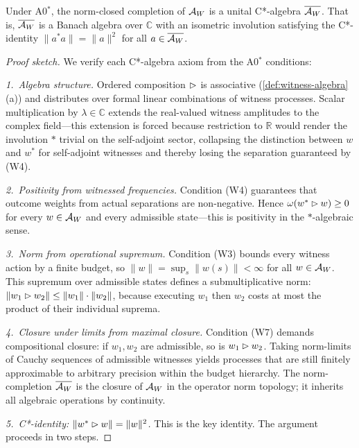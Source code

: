 \begin{theorem}
\label{thm:cstar-completion}
Under A0$^*$, the norm-closed completion of $\mathcal{A}_W$ is a unital
C*-algebra $\overline{\mathcal{A}_W}$.  That is, $\overline{\mathcal{A}_W}$ is a Banach algebra over
$\mathbb{C}$ with an isometric involution satisfying the C*-identity
$\|a^* a\| = \|a\|^2$ for all $a \in \overline{\mathcal{A}_W}$.

\begin{proof}[Proof sketch]
We verify each C*-algebra axiom from the A0$^*$ conditions:

\emph{1.\ Algebra structure.}
Ordered composition $\mathbin{\vartriangleright}$ is associative (\cref{def:witness-algebra}(a))
and distributes over formal linear combinations of witness processes.
Scalar multiplication by $\lambda \in \mathbb{C}$ extends the real-valued
witness amplitudes to the complex field---this extension is forced because
restriction to $\mathbb{R}$ would render the involution $*$ trivial on the
self-adjoint sector, collapsing the distinction between $w$ and $w^*$ for
self-adjoint witnesses and thereby losing the separation guaranteed by (W4).

\emph{2.\ Positivity from witnessed frequencies.}
Condition (W4) guarantees that outcome weights from actual separations are
non-negative.  Hence $\omega(w^* \mathbin{\vartriangleright} w) \geq 0$ for every
$w \in \mathcal{A}_W$ and every admissible state---this is positivity in the
$*$-algebraic sense.

\emph{3.\ Norm from operational supremum.}
Condition (W3) bounds every witness action by a finite budget, so
$\|w\| = \sup_s \|w(s)\| < \infty$ for all $w \in \mathcal{A}_W$.  This supremum
over admissible states defines a submultiplicative norm:
$\|w_1 \mathbin{\vartriangleright} w_2\| \leq \|w_1\| \cdot \|w_2\|$, because executing
$w_1$ then $w_2$ costs at most the product of their individual suprema.

\emph{4.\ Closure under limits from maximal closure.}
Condition (W7) demands compositional closure: if $w_1, w_2$ are admissible,
so is $w_1 \mathbin{\vartriangleright} w_2$.  Taking norm-limits of Cauchy sequences of
admissible witnesses yields processes that are still finitely approximable
to arbitrary precision within the budget hierarchy.  The norm-completion
$\overline{\mathcal{A}_W}$ is the closure of $\mathcal{A}_W$ in the operator norm topology; it
inherits all algebraic operations by continuity.

\emph{5.\ C*-identity: $\|w^* \mathbin{\vartriangleright} w\| = \|w\|^2$.}
This is the key identity.  The argument proceeds in two steps.


\end{proof}
\end{theorem}
